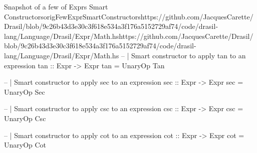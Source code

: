 \begin{haskell}{Snapshot of a few of Exprs Smart Constructors}{origFewExprSmartConstructors}{https://github.com/JacquesCarette/Drasil/blob/9c26b43d3e30c3f618e534a3f176a5152729a\linebreak{}f74/code/drasil-lang/Language/Drasil/Expr/Math.hs}{https://github.com/JacquesCarette/Drasil/blob/9c26b43d3e30c3f618e534a3f176a5152729af74/code/drasil-lang/Language/Drasil/Expr/Math.hs}
-- | Smart constructor to apply tan to an expression
tan :: Expr -> Expr
tan = UnaryOp Tan

-- | Smart constructor to apply sec to an expression
sec :: Expr -> Expr 
sec = UnaryOp Sec

-- | Smart constructor to apply csc to an expression
csc :: Expr -> Expr
csc = UnaryOp Csc

-- | Smart constructor to apply cot to an expression
cot :: Expr -> Expr 
cot = UnaryOp Cot
\end{haskell}
